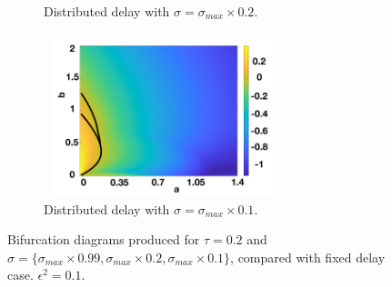 \documentclass[12pt]{report}
\begin{document}
\begin{figure}[H]
\begin{subfigure}[b]{0.45\textwidth}
        \caption{Distributed delay with $\sigma=\sigma_{max}\times0.2$.}
        \label{}
    \end{subfigure}
    \hfill
    \begin{subfigure}[b]{0.45\textwidth}
        \centering
        \includegraphics[width=7cm,height=4.75cm]{distbif34.png}
        \caption{Distributed delay with $\sigma=\sigma_{max}\times0.1$.}
        \label{}
    \end{subfigure}
    \caption{Bifurcation diagrams produced for $\tau=0.2$ and $\sigma=\{ \sigma_{max}\times0.99,\sigma_{max}\times0.2,\sigma_{max}\times0.1 \}$, compared with fixed delay case. $\epsilon^2=0.1$.}
    \label{fig:distbif3}
\end{figure}
\end{document}

